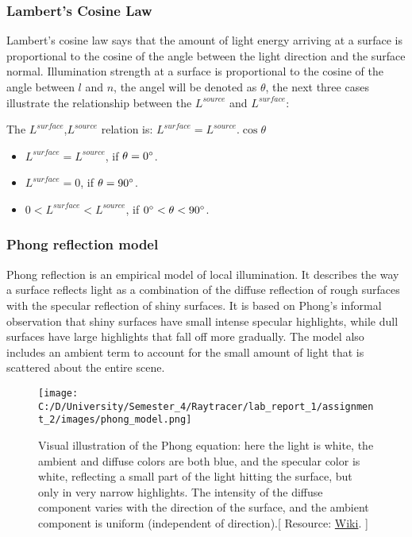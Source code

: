 \documentclass{article}
\begin{document}
\subsubsection{Lambert’s Cosine Law}
Lambert's cosine law says that the amount of light energy arriving at a surface is proportional to the cosine of the angle between the light direction and the surface normal. Illumination strength at a surface is proportional to the cosine of the angle between $l$ and $n$, the angel will be denoted as $\theta$, the next three cases illustrate the relationship between the  $L^{source}$ and  $L^{surface}$:

The  $L^{surface}$,$ L^{source}$ relation is: $L^{surface} = L^{source}.\cos \theta $
\begin{itemize}
	\item $L^{surface} = L^{source}$, if $\theta = 0\degree$.
	\item $L^{surface} = 0$, if $\theta = 90\degree$.
    \item $0 < L^{surface} < L^{source}$, if $0\degree < \theta  < 90\degree$.
\end{itemize}

\subsubsection{Phong reflection model }
Phong reflection is an empirical model of local illumination. It describes the way a surface reflects light as a combination of the diffuse reflection of rough surfaces with the specular reflection of shiny surfaces. It is based on Phong's informal observation that shiny surfaces have small intense specular highlights, while dull surfaces have large highlights that fall off more gradually. The model also includes an ambient term to account for the small amount of light that is scattered about the entire scene.
\\

	\begin{figure}[H]
	\begin{center}
		\texttt{[image: C:/D/University/Semester\_4/Raytracer/lab\_report\_1/assignment\_2/images/phong\_model.png]}
		
		\caption{Visual illustration of the Phong equation: here the light is white, the ambient and diffuse colors are both blue, and the specular color is white, reflecting a small part of the light hitting the surface, but only in very narrow highlights. The intensity of the diffuse component varies with the direction of the surface, and the ambient component is uniform (independent of direction).[ Resource: \href{https://en.wikipedia.org/wiki/Phong_reflection_model}{Wiki}.
			]}
		\label{fig:boat1}
	\end{center}
\end{figure}
\end{document}
